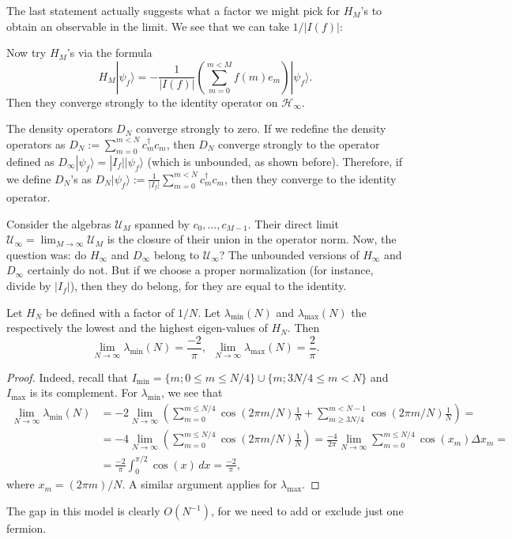 The last statement actually suggests what a factor we might pick for $H_{M}$'s to obtain an observable in the limit. We see that we can take $1/|I(f)|$:
\begin{statement}
Now try $H_M$'s via the formula
\[
H_M|\psi_f\rangle = -\frac{1}{|I(f)|} \left(\sum_{m=0}^{m < M} f(m)e_m\right)|\psi_f\rangle.
\]
Then they converge strongly to the identity operator on $\mathcal H_{\infty}$.
\end{statement}
\begin{statement}
The density operators $D_N$ converge strongly to zero. If we redefine the density operators as $D_N := \sum_{m=0}^{m < N} c_m^\dagger c_m$, then $D_N$ converge strongly to the operator defined as $D_{\infty}|\psi_f\rangle = |I_f||\psi_f\rangle$ (which is unbounded, as shown before). Therefore, if we define $D_{N}$'s as $D_{N}|\psi_f\rangle := \frac{1}{|I_f|}\sum_{m=0}^{m < N} c_m^\dagger c_m$, then they converge to the identity operator.
\end{statement}

\begin{statement}
Consider the algebras $\mathcal U_M$ spanned by $c_0,\ldots,c_{M-1}$. Their direct limit $\mathcal U_{\infty} = \lim_{M \rightarrow \infty} \mathcal U_M$ is the closure of their union in the operator norm. Now, the question was: do $H_{\infty}$ and $D_{\infty}$ belong to $\mathcal U_{\infty}$? The unbounded versions of $H_{\infty}$ and $D_{\infty}$ certainly do not. But if we choose a proper normalization (for instance, divide by $|I_f|$), then they do belong, for they are equal to the identity.
\end{statement}

\begin{statement}
Let $H_N$ be defined with a factor of $1/N$. Let $\lambda_{\min}(N)$ and $\lambda_{\max}(N)$ the respectively the lowest and the highest eigen-values of $H_N$. Then
\[
\lim_{N \rightarrow \infty}\lambda_{\min}(N) = \frac{-2}{\pi}, \ \ \lim_{N \rightarrow \infty}\lambda_{\max}(N) = \frac{2}{\pi}.
\]
\end{statement}
\begin{proof}
Indeed, recall that $I_{\min} = \{m; 0\le m \le N/4\}\cup\{m; 3N/4\le m < N\}$ and $I_{\max}$ is its complement. For $\lambda_{\min}$, we see that
\[\begin{split}
\lim_{N \rightarrow \infty}\lambda_{\min}(N) &= -2\lim_{N \rightarrow \infty} \left(\sum_{m=0}^{m \leq N/4} \cos(2\pi m/N) \frac{1}{N} +\sum_{m\geq 3N/4}^{m < N-1} \cos(2\pi m/N) \frac{1}{N}\right) = \\&= -4\lim_{N \rightarrow \infty} \left(\sum_{m=0}^{m \leq N/4} \cos(2\pi m/N) \frac{1}{N}\right) = \frac{-4}{2\pi} \lim_{N \rightarrow \infty} \sum_{m=0}^{m \leq N/4} \cos(x_m) \Delta x_m = \\&=\frac{-2}{\pi} \int_{0}^{\pi/2} \cos(x) \, dx = \frac{-2}{\pi},
\end{split}
\]
where $x_m = (2\pi m)/N$. A similar argument applies for $\lambda_{\max}$.
\end{proof}
The gap in this model is clearly $O(N^{-1})$, for we need to add or exclude just one fermion.

